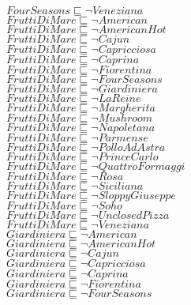 \documentclass[a4paper,10pt]{article}
\begin{document}
 $FourSeasons \sqsubseteq  \lnot Veneziana$\\ 
 $FruttiDiMare \sqsubseteq  \lnot American$\\ 
 $FruttiDiMare \sqsubseteq  \lnot AmericanHot$\\ 
 $FruttiDiMare \sqsubseteq  \lnot Cajun$\\ 
 $FruttiDiMare \sqsubseteq  \lnot Capricciosa$\\ 
 $FruttiDiMare \sqsubseteq  \lnot Caprina$\\ 
 $FruttiDiMare \sqsubseteq  \lnot Fiorentina$\\ 
 $FruttiDiMare \sqsubseteq  \lnot FourSeasons$\\ 
 $FruttiDiMare \sqsubseteq  \lnot Giardiniera$\\ 
 $FruttiDiMare \sqsubseteq  \lnot LaReine$\\ 
 $FruttiDiMare \sqsubseteq  \lnot Margherita$\\ 
 $FruttiDiMare \sqsubseteq  \lnot Mushroom$\\ 
 $FruttiDiMare \sqsubseteq  \lnot Napoletana$\\ 
 $FruttiDiMare \sqsubseteq  \lnot Parmense$\\ 
 $FruttiDiMare \sqsubseteq  \lnot PolloAdAstra$\\ 
 $FruttiDiMare \sqsubseteq  \lnot PrinceCarlo$\\ 
 $FruttiDiMare \sqsubseteq  \lnot QuattroFormaggi$\\ 
 $FruttiDiMare \sqsubseteq  \lnot Rosa$\\ 
 $FruttiDiMare \sqsubseteq  \lnot Siciliana$\\ 
 $FruttiDiMare \sqsubseteq  \lnot SloppyGiuseppe$\\ 
 $FruttiDiMare \sqsubseteq  \lnot Soho$\\ 
 $FruttiDiMare \sqsubseteq  \lnot UnclosedPizza$\\ 
 $FruttiDiMare \sqsubseteq  \lnot Veneziana$\\ 
 $Giardiniera \sqsubseteq  \lnot American$\\ 
 $Giardiniera \sqsubseteq  \lnot AmericanHot$\\ 
 $Giardiniera \sqsubseteq  \lnot Cajun$\\ 
 $Giardiniera \sqsubseteq  \lnot Capricciosa$\\ 
 $Giardiniera \sqsubseteq  \lnot Caprina$\\ 
 $Giardiniera \sqsubseteq  \lnot Fiorentina$\\ 
 $Giardiniera \sqsubseteq  \lnot FourSeasons$\\ 
\end{document}
